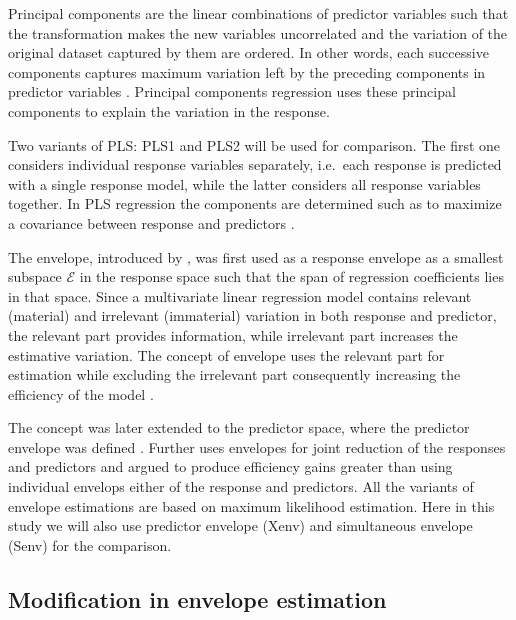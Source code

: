 \documentclass[12pt,3p,authoryear]{elsarticle}
\providecommand{\tightlist}{%
  \setlength{\itemsep}{0pt}\setlength{\parskip}{0pt}}
\begin{document}
\begin{description}
\tightlist
\item[\emph{Principal Components Regression (PCR):}]
Principal components are the linear combinations of predictor variables
such that the transformation makes the new variables uncorrelated and
the variation of the original dataset captured by them are ordered. In
other words, each successive components captures maximum variation left
by the preceding components in predictor variables \citep{Jolliffe2002}.
Principal components regression uses these principal components to
explain the variation in the response.
\item[\emph{Partial Least Squares (PLS):}]
Two variants of PLS: PLS1 and PLS2 will be used for comparison. The
first one considers individual response variables separately, i.e.~each
response is predicted with a single response model, while the latter
considers all response variables together. In PLS regression the
components are determined such as to maximize a covariance between
response and predictors \citep{DeJong1993}.
\item[\emph{Envelopes:}]
The envelope, introduced by \citet{Cook2007a}, was first used as a
response envelope \citep{cook2010envelope} as a smallest subspace
\(\mathcal{E}\) in the response space such that the span of regression
coefficients lies in that space. Since a multivariate linear regression
model contains relevant (material) and irrelevant (immaterial) variation
in both response and predictor, the relevant part provides information,
while irrelevant part increases the estimative variation. The concept of
envelope uses the relevant part for estimation while excluding the
irrelevant part consequently increasing the efficiency of the model
\citep{cook2016algorithms}.

The concept was later extended to the predictor space, where the
predictor envelope was defined \citep{cook2013envelopes}. Further
\citet{cook2015simultaneous} uses envelopes for joint reduction of the
responses and predictors and argued to produce efficiency gains greater
than using individual envelops either of the response and predictors.
All the variants of envelope estimations are based on maximum likelihood
estimation. Here in this study we will also use predictor envelope
(Xenv) and simultaneous envelope (Senv) for the comparison.
\end{description}

\hypertarget{modification-in-envelope-estimation}{%
\subsection{Modification in envelope
estimation}\label{modification-in-envelope-estimation}}
\end{document}
